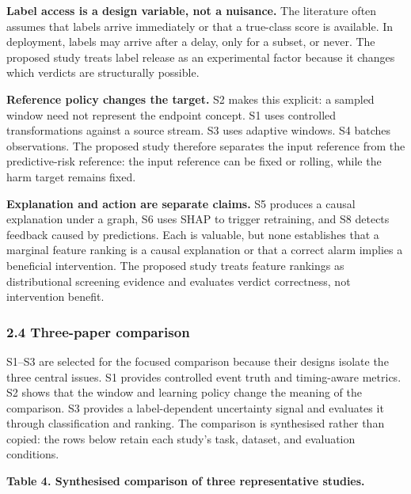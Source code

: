 \documentclass[
]{article}
\begin{document}
\textbf{Label access is a design variable, not a nuisance.} The
literature often assumes that labels arrive immediately or that a
true-class score is available. In deployment, labels may arrive after a
delay, only for a subset, or never. The proposed study treats label
release as an experimental factor because it changes which verdicts are
structurally possible.

\textbf{Reference policy changes the target.} S2 makes this explicit: a
sampled window need not represent the endpoint concept. S1 uses
controlled transformations against a source stream. S3 uses adaptive
windows. S4 batches observations. The proposed study therefore separates
the input reference from the predictive-risk reference: the input
reference can be fixed or rolling, while the harm target remains fixed.

\textbf{Explanation and action are separate claims.} S5 produces a
causal explanation under a graph, S6 uses SHAP to trigger retraining,
and S8 detects feedback caused by predictions. Each is valuable, but
none establishes that a marginal feature ranking is a causal explanation
or that a correct alarm implies a beneficial intervention. The proposed
study treats feature rankings as distributional screening evidence and
evaluates verdict correctness, not intervention benefit.

\hypertarget{three-paper-comparison}{%
\subsubsection{2.4 Three-paper
comparison}\label{three-paper-comparison}}

S1--S3 are selected for the focused comparison because their designs
isolate the three central issues. S1 provides controlled event truth and
timing-aware metrics. S2 shows that the window and learning policy
change the meaning of the comparison. S3 provides a label-dependent
uncertainty signal and evaluates it through classification and ranking.
The comparison is synthesised rather than copied: the rows below retain
each study's task, dataset, and evaluation conditions.

\textbf{Table 4. Synthesised comparison of three representative
studies.}
\end{document}
